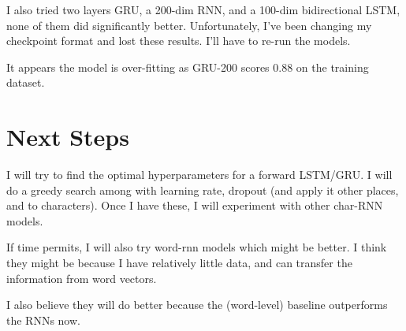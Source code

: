 \documentclass{article} %
\begin{document}
I also tried two layers GRU, a 200-dim RNN, and a 100-dim bidirectional LSTM, none of them did significantly better. Unfortunately, I've been changing my checkpoint format and lost these results. I'll have to re-run the models.


It appears the model is over-fitting as GRU-200 scores 0.88 on the training dataset.

\section{Next Steps}
I will try to find the optimal hyperparameters for a forward LSTM/GRU. I will do a greedy search among with learning rate, dropout (and apply it other places, and to characters). Once I have these, I will experiment with other char-RNN models.

If time permits, I will also try word-rnn models which might be better. I think they might be because I have relatively little data, and can transfer the information from word vectors. 

I also believe they will do better because the (word-level) baseline outperforms the RNNs now. 

\nocite{*}


\end{document}
